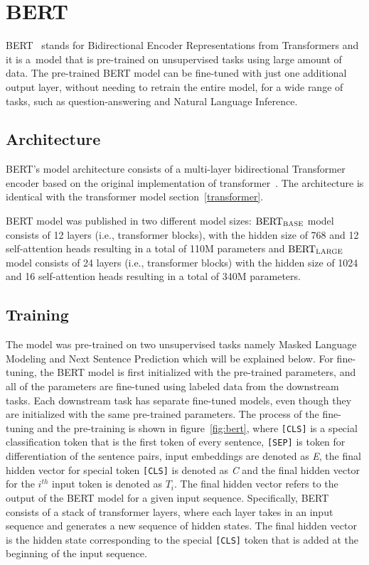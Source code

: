 \section{BERT}
BERT~\cite{bert} stands for Bidirectional Encoder Representations from Transformers and it is a~model that is pre-trained on unsupervised tasks using large amount of data. The pre-trained BERT model can be fine-tuned with just one additional output layer, without needing to retrain the entire model, for a wide range of tasks, such as question-answering and Natural Language Inference.
\subsection*{Architecture}
BERT’s model architecture consists of a multi-layer bidirectional Transformer encoder based on the original implementation of transformer~\cite{transformer}. The architecture is identical with the transformer model section~\ref{transformer}.

BERT model was published in two different model sizes: $\text{BERT}_{\textsc{BASE}}$ model consists of 12 layers (i.e., transformer blocks), with the hidden size of 768 and 12 self-attention heads resulting in a total of 110M parameters and $\text{BERT}_{\textsc{LARGE}}$ model consists of 24 layers (i.e., transformer blocks) with the hidden size of 1024 and 16 self-attention heads resulting in a total of 340M parameters.

\subsection*{Training}
The model was pre-trained on two unsupervised tasks namely Masked Language Modeling and Next Sentence Prediction which will be explained below. For fine-tuning, the BERT model is first initialized with the pre-trained parameters, and all of the parameters are fine-tuned using labeled data from the downstream tasks. Each downstream task has separate fine-tuned models, even though they are initialized with the same pre-trained parameters. The process of the fine-tuning and the pre-training is shown in figure~\ref{fig:bert}, where \texttt{[CLS]} is a special classification token that is the first token of every sentence, \texttt{[SEP]} is token for differentiation of the sentence pairs, input embeddings are denoted as \emph{E}, the final hidden vector for special token \texttt{[CLS]} is denoted as \emph{C} and the final hidden vector for the $i^{th}$ input token is denoted as $T_i$. The final hidden vector refers to the output of the BERT model for a given input sequence. Specifically, BERT consists of a stack of transformer layers, where each layer takes in an input sequence and generates a new sequence of hidden states. The final hidden vector is the hidden state corresponding to the special \texttt{[CLS]} token that is added at the beginning of the input sequence.

